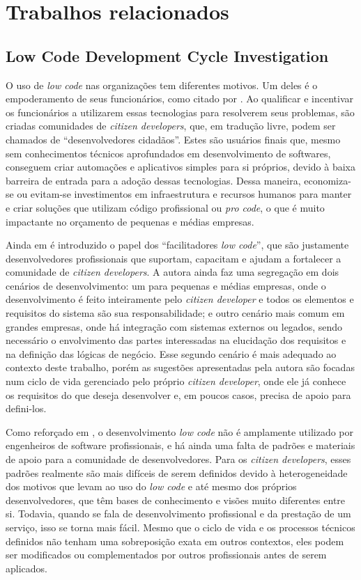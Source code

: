 	\section{Trabalhos relacionados}

	\subsection{Low Code Development Cycle Investigation}

	O uso de \textit{low code} nas organizações tem diferentes motivos. Um deles é o empoderamento de seus funcionários, como citado por \cite{LowCodeLifeCicle}.
	Ao qualificar e incentivar os funcionários a utilizarem essas tecnologias para resolverem seus problemas, são criadas comunidades de \textit{citizen developers}, que, em tradução livre, podem ser
	chamados de ``desenvolvedores cidadãos''. Estes são usuários finais que, mesmo sem conhecimentos técnicos aprofundados em desenvolvimento de softwares, conseguem criar automações e aplicativos
	simples para si próprios, devido à baixa barreira de entrada para a adoção dessas tecnologias. Dessa maneira, economiza-se ou evitam-se investimentos em
	infraestrutura e recursos humanos para manter e criar soluções que utilizam código profissional ou \textit{pro code}, o que é muito impactante no orçamento de pequenas e médias empresas.

	Ainda em \cite{LowCodeLifeCicle} é introduzido o papel dos ``facilitadores \textit{low code}'', que são justamente desenvolvedores profissionais que suportam, capacitam e ajudam a
	fortalecer a comunidade de \textit{citizen developers}. A autora ainda faz uma segregação em dois cenários de desenvolvimento: um para pequenas e médias empresas, onde o desenvolvimento
	é feito inteiramente pelo \textit{citizen developer} e todos os elementos e requisitos do sistema são sua responsabilidade; e outro cenário mais comum em grandes empresas, onde há
	integração com sistemas externos ou legados, sendo necessário o envolvimento das partes interessadas na elucidação dos requisitos e na definição das lógicas de negócio. Esse
	segundo cenário é mais adequado ao contexto deste trabalho, porém as sugestões apresentadas pela autora são focadas num ciclo de vida gerenciado pelo próprio \textit{citizen developer},
	onde ele já conhece os requisitos do que deseja desenvolver e, em poucos casos, precisa de apoio para defini-los.

	Como reforçado em \cite{LowCodeLifeCicle}, o desenvolvimento \textit{low code} não é amplamente utilizado por engenheiros de software profissionais, e há ainda uma falta de padrões e
	materiais de apoio para a comunidade de desenvolvedores. Para os \textit{citizen developers}, esses padrões realmente são mais difíceis de serem definidos devido à heterogeneidade dos
	motivos que levam ao uso do \textit{low code} e até mesmo dos próprios desenvolvedores, que têm bases de conhecimento e visões muito diferentes entre si. Todavia, quando se fala de desenvolvimento
	profissional e da prestação de um serviço, isso se torna mais fácil. Mesmo que o ciclo de vida e os processos técnicos definidos não tenham uma sobreposição exata em outros contextos, eles podem
	ser modificados ou complementados por outros profissionais antes de serem aplicados.


